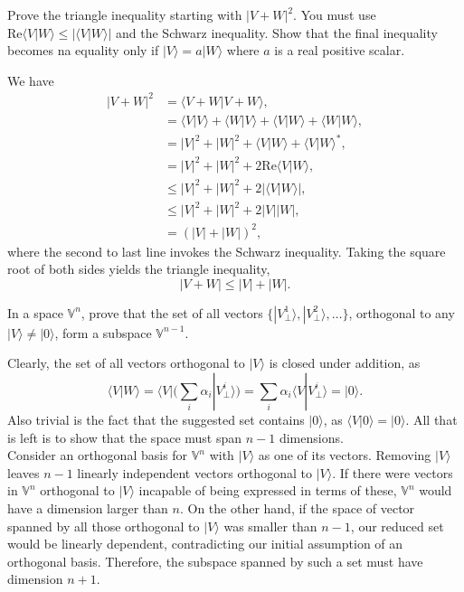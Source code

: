 \documentclass[../principles-of-quantum-mechanics.tex]{subfiles}
\begin{document}
\begin{questions}
\question Prove the triangle inequality starting with $|V+W|^2$. You must use $\mathrm{Re}\langle{V}|W\rangle\leq|\langle{V}|W\rangle|$ and the Schwarz inequality. Show that the final inequality becomes na equality only if $|V\rangle = a|W\rangle$ where $a$ is a real positive scalar.

\begin{solution}
	We have
	\begin{align*}
		|V+W|^2 &= \langle{V + W}|{V + W}\rangle, \\
		&= \langle{V}|V\rangle + \langle{W}|V\rangle + \langle{V}|W\rangle + \langle{W}|W\rangle, \\
		&= |V|^2 + |W|^2 + \langle{V}|W\rangle + \langle{V}|W\rangle^*, \\
		&= |V|^2 + |W|^2 + 2\mathrm{Re}\langle{V}|W\rangle, \\
		&\leq |V|^2 + |W|^2 + 2|\langle{V}|W\rangle|, \\
		&\leq |V|^2 + |W|^2 + 2|V||W|, \\
		&= (|V| + |W|)^2,
	\end{align*}
	where the second to last line invokes the Schwarz inequality. Taking the square root of both sides yields the triangle inequality,
	\[
		|V + W| \leq |V| + |W|.
	\]
\end{solution}
  
\question In a space $\mathbb{V}^n$, prove that the set of all vectors $\{|V_\perp^1\rangle, |V_\perp^2\rangle,\dots\}$, orthogonal to any $|V\rangle\neq|0\rangle$, form a subspace $\mathbb{V}^{n-1}$.

\begin{solution}
	Clearly, the set of all vectors orthogonal to $|V\rangle$ is closed under addition, as 
	\[
		\langle{V}|W\rangle = \langle{V}|\Big(\sum_i\alpha_i|V_\perp^i\rangle\Big) = \sum_i\alpha_i\langle{V}|V_\perp^i\rangle = |0\rangle.
	\]
	Also trivial is the fact that the suggested set contains $|0\rangle$, as $\langle{V}|0\rangle=|0\rangle$. All that is left is to show that the space must span $n-1$ dimensions. \\
	
	Consider an orthogonal basis for $\mathbb{V}^n$ with $|V\rangle$ as one of its vectors. Removing $|V\rangle$ leaves $n-1$ linearly independent vectors orthogonal to $|V\rangle$. If there were vectors in $\mathbb{V}^n$ orthogonal to $|V\rangle$ incapable of being expressed in terms of these, $\mathbb{V}^n$ would have a dimension larger than $n$. On the other hand, if the space of vector spanned by all those orthogonal to $|V\rangle$ was smaller than $n-1$, our reduced set would be linearly dependent, contradicting our initial assumption of an orthogonal basis. Therefore, the subspace spanned by such a set must have dimension $n+1$.
\end{solution}


\end{questions}
\end{document}
